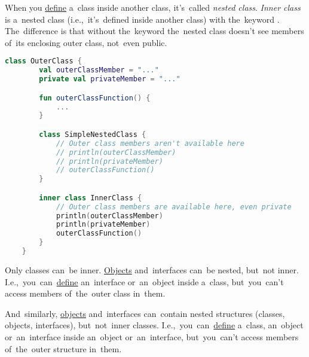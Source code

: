 \label{kotlininnerclass}
When you \hyperref[declarationdefinition]{define} a~class inside another class, it's~called \textit{nested class}.
\textit{Inner class} is a~nested class (i.e.,~it's~defined inside another class) with the~keyword .
The~difference is that without the~keyword the~nested class doesn't see members of~its enclosing outer class, not~even public.

\begin{lstlisting}[language=Kotlin]
    class OuterClass {
        val outerClassMember = "..."
        private val privateMember = "..."

        fun outerClassFunction() {
            ...
        }

        class SimpleNestedClass {
            // Outer class members aren't available here
            // println(outerClassMember)
            // println(privateMember)
            // outerClassFunction()
        }

        inner class InnerClass {
            // Outer class members are available here, even private
            println(outerClassMember)
            println(privateMember)
            outerClassFunction()
        }
    }
\end{lstlisting}
\newline

\noindent Only classes can~be inner.
\hyperref[kotlinobject]{Objects} and~interfaces can~be nested, but~not inner.
I.e.,~you~can~\hyperref[declarationdefinition]{define} an~interface or~an~object inside a~class, but~you~can't access members of~the~outer class in~them.

And~similarly, \hyperref[kotlinobject]{objects} and~interfaces can~contain nested structures (classes, objects, interfaces), but~not~inner classes.
I.e.,~you~can~\hyperref[declarationdefinition]{define} a~class, an~object or~an~interface inside an~object or~an~interface,  but~you~can't access members of~the~outer structure in~them.
\newpage
